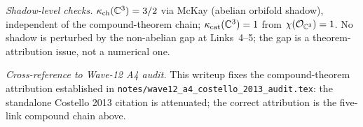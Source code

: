 \emph{Shadow-level checks.}
$\kappa_{\mathrm{ch}}(\mathbb{C}^3) = 3/2$ via McKay (abelian orbifold shadow), independent
of the compound-theorem chain; $\kappa_{\mathrm{cat}}(\mathbb{C}^3) = 1$ from
$\chi(\mathcal{O}_{\mathbb{C}^3}) = 1$.
No shadow is perturbed by the non-abelian gap at Links~4--5; the
gap is a theorem-attribution issue, not a numerical one.

\emph{Cross-reference to Wave-12 A4 audit.}
This writeup fixes the compound-theorem attribution established in
\texttt{notes/wave12\_a4\_costello\_2013\_audit.tex}: the standalone
Costello 2013 citation is attenuated; the correct attribution is the
five-link compound chain above.
